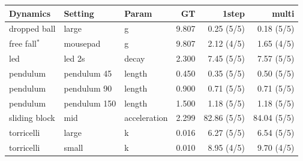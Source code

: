 \begin{tabular}{lll r r r}
\toprule
Dynamics & Setting & Param & GT & 1step & multi \\
\midrule
dropped ball & large & g & 9.807 & 0.25 (5/5) & 0.18 (5/5) \\
free fall$^\ast$ & mousepad & g & 9.807 & 2.12 (4/5) & 1.65 (4/5) \\
led & led 2s & decay & 2.300 & 7.45 (5/5) & 7.57 (5/5) \\
pendulum & pendulum 45 & length & 0.450 & 0.35 (5/5) & 0.50 (5/5) \\
pendulum & pendulum 90 & length & 0.900 & 0.71 (5/5) & 0.71 (5/5) \\
pendulum & pendulum 150 & length & 1.500 & 1.18 (5/5) & 1.18 (5/5) \\
sliding block & mid & acceleration & 2.299 & 82.86 (5/5) & 84.04 (5/5) \\
torricelli & large & k & 0.016 & 6.27 (5/5) & 6.54 (5/5) \\
torricelli & small & k & 0.010 & 8.95 (4/5) & 9.70 (4/5) \\
\bottomrule
\end{tabular}
